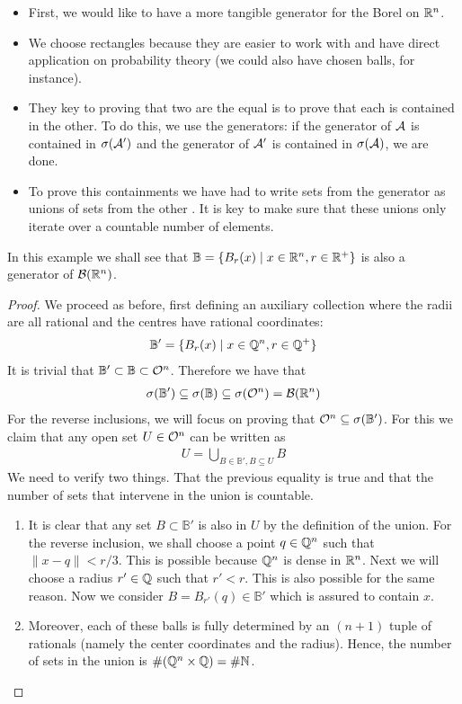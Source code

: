\begin{itemize}
	\item First, we would like to have a more tangible generator for the Borel \siga on $\mathbb{R}^n$.
	\item We choose rectangles because they are easier to work with and have direct application on probability theory (we could also have chosen balls, for instance).
	\item They key to proving that two \sigas are the equal is to prove that each is contained in the other. To do this, we use the generators: if the generator of $\mathcal{A}$ is contained in $\sigma(\mathcal{A}')$ and the generator of $\mathcal{A}'$ is contained in $\sigma(\mathcal{A})$, we are done.
	\item To prove this containments we have had to write sets from the generator as unions of sets from the other \siga. It is key to make sure that these unions only iterate over a countable number of elements.
\end{itemize}

\newcommand{\B}{\mathbb{B}}
\begin{eg}
	In this example we shall see that $\B = \{B_r(x) \mid x \in \R^n, r \in \R^+\}$ is also a generator of $\mathcal{B}(\mathbb{R}^n)$.
\end{eg}

\begin{proof}
	We proceed as before, first defining an auxiliary collection where the radii are all rational and the centres have rational coordinates:
	\begin{align*}
	\B' = \{B_r(x) \mid x \in \Q^n, r \in \Q^+\}
	\end{align*}
	It is trivial that $\B' \subset \B \subset \OS^n$. Therefore we have that
	\begin{align*}
	\sigma(\B') \subseteq \sigma(\B) \subseteq \sigma(\OS^n) = \borel(\R^n)
	\end{align*}
	For the reverse inclusions, we will focus on proving that $\OS^n \subseteq \sigma(\B')$. For this we claim that any open set $U \in \mathcal{O}^n$ can be written as
	\begin{align*}
	U = \bigcup_{B \in \B', B \subseteq U} B
	\end{align*}
	We need to verify two things. That the previous equality is true and that the number of sets that intervene in the union is countable.
	\begin{enumerate}
		\item It is clear that any set $B\subset \B'$ is also in $U$ by the definition of the union. For the reverse inclusion, we shall choose a point $q \in \mathbb{Q}^n$ such that $\lVert x - q \rVert < r / 3$. This is possible because $\mathbb{Q}^n$ is dense in $\mathbb{R}^n$. Next we will choose a radius $r' \in \mathbb{Q}$ such that $r' < r$. This is also possible for the same reason. Now we consider $B = B_{r'}(q) \in \B'$ which is assured to contain $x$.
		
		\item Moreover, each of these balls is fully determined by an $(n+1)$ tuple of rationals (namely the center coordinates and the radius). Hence, the number of sets in the union is $\#(\mathbb{Q}^n \times \mathbb{Q}) = \# \mathbb{N}$.
	\end{enumerate}
\end{proof}